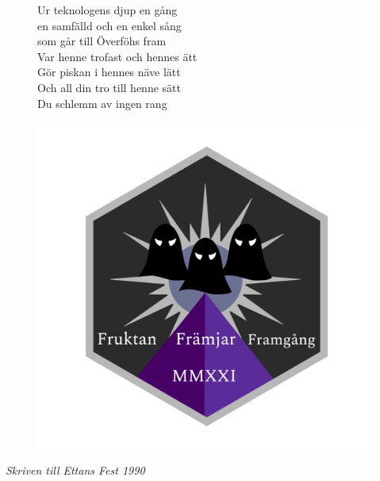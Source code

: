 \documentclass[a6paper,10pt]{article}
\begin{document}
\setlength{\oddsidemargin}{-0.47in}
\noindent
\begin{center}
\end{center}
\vspace{-15pt}
\begin{figure}[!h]
\begin{minipage}{0.6\linewidth}
\small Ur teknologens djup en gång\\
en samfälld och en enkel sång\\
som går till Överföhs fram
\vspace{5pt}\\
Var henne trofast och hennes ätt\\
Gör piskan i hennes näve lätt\\
Och all din tro till henne sätt\\
Du schlemm av ingen rang
\end{minipage}
\begin{minipage}{0.38\linewidth}
\includegraphics[width=\textwidth]{loggan.png}
\end{minipage}
\end{figure}
\vspace{-10pt}
\begin{flushright}
\textit{Skriven till Ettans Fest 1990}
\end{flushright}
\vspace{10pt}
\end{document}
